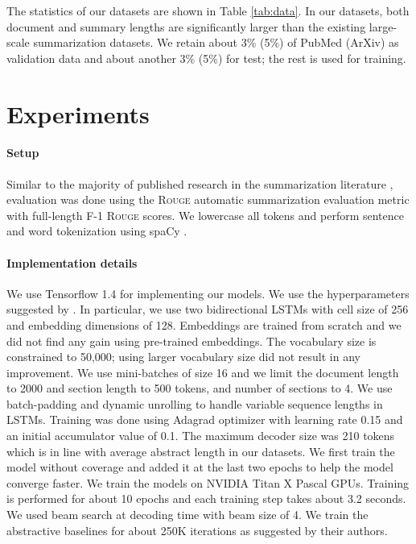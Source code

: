 \documentclass[11pt,a4paper]{article}
\begin{document}
The statistics of our datasets are shown in Table \ref{tab:data}. In our datasets, both document and summary lengths are significantly larger than the existing large-scale summarization datasets. We retain about 3\%  (5\%) of PubMed (ArXiv) as validation data and about another 3\% (5\%) for test; the rest is used for training.





\section{Experiments}
\paragraph{Setup}



Similar to the majority of published research in the summarization literature \cite{chopra2016abstractive,nallapati2016abstractive,see2017get}, evaluation was done using the \textsc{Rouge} automatic summarization evaluation metric \cite{lin2004rouge} with full-length F-1 \textsc{Rouge} scores. We lowercase all tokens and perform sentence and word tokenization using spaCy \cite{honnibal-johnson:2015:EMNLP}.



\paragraph{Implementation details}
We use Tensorflow 1.4 for implementing our models. We use the hyperparameters suggested by \citet{see2017get}. In particular, we use two bidirectional LSTMs with cell size of 256 and embedding dimensions of 128. Embeddings are trained from scratch and we did not find any gain using pre-trained embeddings. The vocabulary size is constrained to 50,000; using larger vocabulary size did not result in any improvement. We use mini-batches of size 16 and we limit the document length to 2000 and section length to 500 tokens, and number of sections to 4. We use batch-padding and dynamic unrolling to handle variable sequence lengths in LSTMs. Training was done using Adagrad optimizer with learning rate 0.15
and an initial accumulator value of 0.1. The maximum decoder size was 210 tokens which is in line with average abstract length in our datasets. We first train the model without coverage and added it at the last two epochs to help the model converge faster. We train the models on NVIDIA Titan X Pascal GPUs. Training is performed for about 10 epochs and each training step takes about 3.2 seconds. We used beam search at decoding time with beam size of 4. We train the abstractive baselines for about 250K iterations as suggested by their authors.
\end{document}
